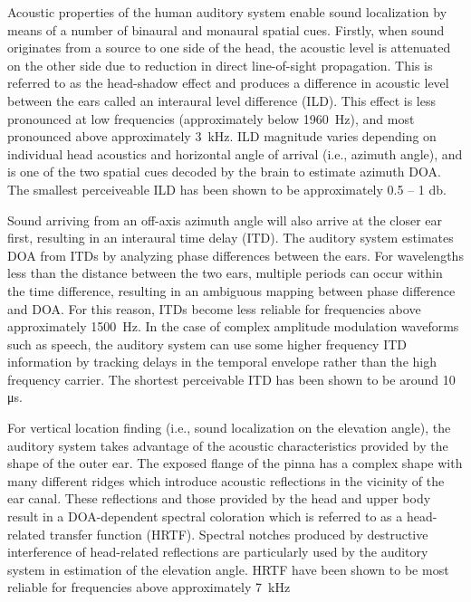 Acoustic properties of the human auditory system enable sound localization by means of a number of binaural and monaural spatial cues. Firstly, when sound originates from a source to one side of the head, the acoustic level is attenuated on the other side due to reduction in direct line-of-sight propagation. This is referred to as the head-shadow effect and produces a difference in acoustic level between the ears called an interaural level difference (ILD). This effect is less pronounced at low frequencies (approximately below \qty{1960}{\hertz}), and most pronounced above approximately \qty{3}{\kilo\hertz}. ILD magnitude varies depending on individual head acoustics and horizontal angle of arrival (i.e., azimuth angle), and is one of the two spatial cues decoded by the brain to estimate azimuth DOA. The smallest perceiveable ILD has been shown to be approximately 0.5 -- 1 \unit{\decibel}.

Sound arriving from an off-axis azimuth angle will also arrive at the closer ear first, resulting in an interaural time delay (ITD). The auditory system estimates DOA from ITDs by analyzing phase differences between the ears. For wavelengths less than the distance between the two ears, multiple periods can occur within the time difference, resulting in an ambiguous mapping between phase difference and DOA. For this reason, ITDs become less reliable for frequencies above approximately \qty{1500}{\hertz}. In the case of complex amplitude modulation waveforms such as speech, the auditory system can use some higher frequency ITD information by tracking delays in the temporal envelope rather than the high frequency carrier. The shortest perceivable ITD has been shown to be around 10 \unit{\micro\second}.

For vertical location finding (i.e., sound localization on the elevation angle), the auditory system takes advantage of the acoustic characteristics provided by the shape of the outer ear. The exposed flange of the pinna has a complex shape with many different ridges which introduce acoustic reflections in the vicinity of the ear canal. These reflections and those provided by the head and upper body result in a DOA-dependent spectral coloration which is referred to as a head-related transfer function (HRTF). Spectral notches produced by destructive interference of head-related reflections are particularly used by the auditory system in estimation of the elevation angle. HRTF have been shown to be most reliable for frequencies above approximately \qty{7}{\kilo\hertz}

